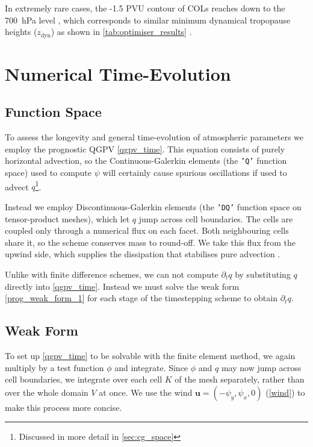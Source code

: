 \documentclass{article}
\begin{document}
In extremely rare cases, the -1.5 PVU contour of COLs reaches down to the \qty{700}{\hecto \pascal} level \cite{Barnes2021col, Skerlak2015}, which corresponds to similar minimum dynamical tropopause heights ($z_\text{dyn}$) as shown in \cref{tab:optimiser_results} \cite{Stull2015}.

\section{Numerical Time-Evolution}

\subsection{Function Space}

To assess the longevity and general time-evolution of atmospheric parameters we employ the prognostic QGPV \cref{qgpv_time}.
This equation consists of purely horizontal advection, so the Continuous-Galerkin elements (the \texttt{'Q'} function space) used to compute $\psi$ will certainly cause spurious oscillations if used to advect $q$\footnote{Discussed in more detail in \cref{sec:cg_space}}.

Instead we employ Discontinuous-Galerkin elements (the \texttt{'DQ'} function space on tensor-product meshes), which let $q$ jump across cell boundaries.
The cells are coupled only through a numerical flux on each facet.
Both neighbouring cells share it, so the scheme conserves mass to round-off.
We take this flux from the upwind side, which supplies the dissipation that stabilises pure advection \cite{Moura2015}.

Unlike with finite difference schemes, we can not compute $\partial_t q$ by substituting $q$ directly into \cref{qgpv_time}.
Instead we must solve the weak form \cref{prog_weak_form_1} for each stage of the timestepping scheme to obtain $\partial_t q$.

\subsection{Weak Form}\label{sec:prognostic_weak_form}
To set up \cref{qgpv_time} to be solvable with the finite element method, we again multiply by a test function $\phi$ and integrate.
Since $\phi$ and $q$ may now jump across cell boundaries, we integrate over each cell $K$ of the mesh separately, rather than over the whole domain $V$ at once.
We use the wind $\bm u = (-\psi_y, \psi_x, 0)$ (\cref{wind}) to make this process more concise.
\end{document}
